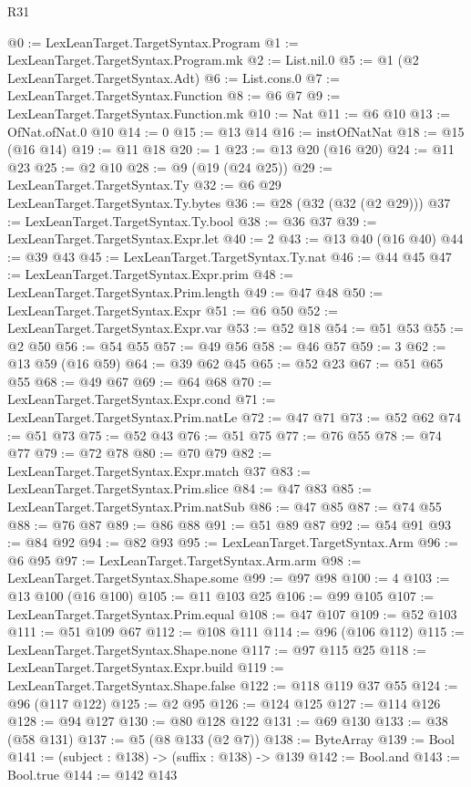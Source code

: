 \begin{lexlean}{R31}
\begin{coremodule}
@0 := LexLeanTarget.TargetSyntax.Program
@1 := LexLeanTarget.TargetSyntax.Program.mk
@2 := List.nil.{0}
@5 := @1 (@2 LexLeanTarget.TargetSyntax.Adt)
@6 := List.cons.{0}
@7 := LexLeanTarget.TargetSyntax.Function
@8 := @6 @7
@9 := LexLeanTarget.TargetSyntax.Function.mk
@10 := Nat
@11 := @6 @10
@13 := OfNat.ofNat.{0} @10
@14 := 0
@15 := @13 @14
@16 := instOfNatNat
@18 := @15 (@16 @14)
@19 := @11 @18
@20 := 1
@23 := @13 @20 (@16 @20)
@24 := @11 @23
@25 := @2 @10
@28 := @9 (@19 (@24 @25))
@29 := LexLeanTarget.TargetSyntax.Ty
@32 := @6 @29 LexLeanTarget.TargetSyntax.Ty.bytes
@36 := @28 (@32 (@32 (@2 @29)))
@37 := LexLeanTarget.TargetSyntax.Ty.bool
@38 := @36 @37
@39 := LexLeanTarget.TargetSyntax.Expr.let
@40 := 2
@43 := @13 @40 (@16 @40)
@44 := @39 @43
@45 := LexLeanTarget.TargetSyntax.Ty.nat
@46 := @44 @45
@47 := LexLeanTarget.TargetSyntax.Expr.prim
@48 := LexLeanTarget.TargetSyntax.Prim.length
@49 := @47 @48
@50 := LexLeanTarget.TargetSyntax.Expr
@51 := @6 @50
@52 := LexLeanTarget.TargetSyntax.Expr.var
@53 := @52 @18
@54 := @51 @53
@55 := @2 @50
@56 := @54 @55
@57 := @49 @56
@58 := @46 @57
@59 := 3
@62 := @13 @59 (@16 @59)
@64 := @39 @62 @45
@65 := @52 @23
@67 := @51 @65 @55
@68 := @49 @67
@69 := @64 @68
@70 := LexLeanTarget.TargetSyntax.Expr.cond
@71 := LexLeanTarget.TargetSyntax.Prim.natLe
@72 := @47 @71
@73 := @52 @62
@74 := @51 @73
@75 := @52 @43
@76 := @51 @75
@77 := @76 @55
@78 := @74 @77
@79 := @72 @78
@80 := @70 @79
@82 := LexLeanTarget.TargetSyntax.Expr.match @37
@83 := LexLeanTarget.TargetSyntax.Prim.slice
@84 := @47 @83
@85 := LexLeanTarget.TargetSyntax.Prim.natSub
@86 := @47 @85
@87 := @74 @55
@88 := @76 @87
@89 := @86 @88
@91 := @51 @89 @87
@92 := @54 @91
@93 := @84 @92
@94 := @82 @93
@95 := LexLeanTarget.TargetSyntax.Arm
@96 := @6 @95
@97 := LexLeanTarget.TargetSyntax.Arm.arm
@98 := LexLeanTarget.TargetSyntax.Shape.some
@99 := @97 @98
@100 := 4
@103 := @13 @100 (@16 @100)
@105 := @11 @103 @25
@106 := @99 @105
@107 := LexLeanTarget.TargetSyntax.Prim.equal
@108 := @47 @107
@109 := @52 @103
@111 := @51 @109 @67
@112 := @108 @111
@114 := @96 (@106 @112)
@115 := LexLeanTarget.TargetSyntax.Shape.none
@117 := @97 @115 @25
@118 := LexLeanTarget.TargetSyntax.Expr.build
@119 := LexLeanTarget.TargetSyntax.Shape.false
@122 := @118 @119 @37 @55
@124 := @96 (@117 @122)
@125 := @2 @95
@126 := @124 @125
@127 := @114 @126
@128 := @94 @127
@130 := @80 @128 @122
@131 := @69 @130
@133 := @38 (@58 @131)
@137 := @5 (@8 @133 (@2 @7))
@138 := ByteArray
@139 := Bool
@141 := (subject : @138) -> (suffix : @138) -> @139
@142 := Bool.and
@143 := Bool.true
@144 := @142 @143

\end{coremodule}
\end{lexlean}
